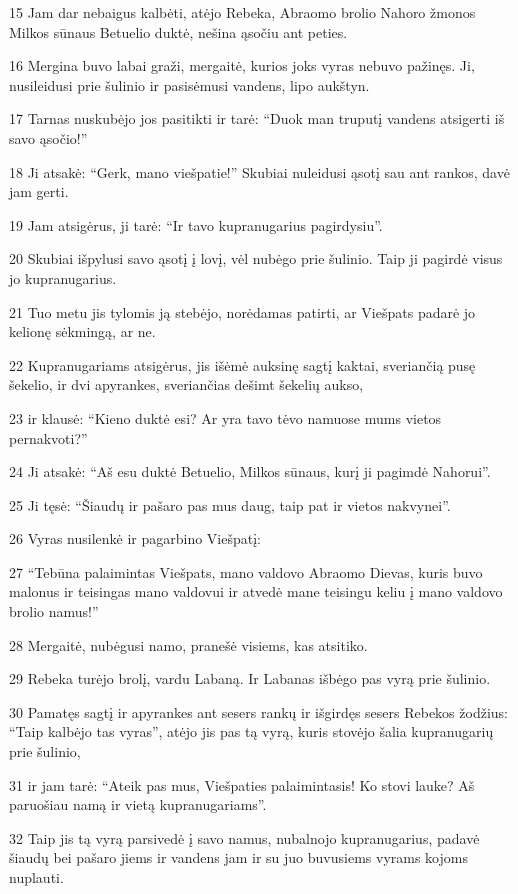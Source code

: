 \par 15 Jam dar nebaigus kalbėti, atėjo Rebeka, Abraomo brolio Nahoro žmonos Milkos sūnaus Betuelio duktė, nešina ąsočiu ant peties. 
\par 16 Mergina buvo labai graži, mergaitė, kurios joks vyras nebuvo pažinęs. Ji, nusileidusi prie šulinio ir pasisėmusi vandens, lipo aukštyn. 
\par 17 Tarnas nuskubėjo jos pasitikti ir tarė: “Duok man truputį vandens atsigerti iš savo ąsočio!” 
\par 18 Ji atsakė: “Gerk, mano viešpatie!” Skubiai nuleidusi ąsotį sau ant rankos, davė jam gerti. 
\par 19 Jam atsigėrus, ji tarė: “Ir tavo kupranugarius pagirdysiu”. 
\par 20 Skubiai išpylusi savo ąsotį į lovį, vėl nubėgo prie šulinio. Taip ji pagirdė visus jo kupranugarius. 
\par 21 Tuo metu jis tylomis ją stebėjo, norėdamas patirti, ar Viešpats padarė jo kelionę sėkmingą, ar ne. 
\par 22 Kupranugariams atsigėrus, jis išėmė auksinę sagtį kaktai, sveriančią pusę šekelio, ir dvi apyrankes, sveriančias dešimt šekelių aukso, 
\par 23 ir klausė: “Kieno duktė esi? Ar yra tavo tėvo namuose mums vietos pernakvoti?” 
\par 24 Ji atsakė: “Aš esu duktė Betuelio, Milkos sūnaus, kurį ji pagimdė Nahorui”. 
\par 25 Ji tęsė: “Šiaudų ir pašaro pas mus daug, taip pat ir vietos nakvynei”. 
\par 26 Vyras nusilenkė ir pagarbino Viešpatį: 
\par 27 “Tebūna palaimintas Viešpats, mano valdovo Abraomo Dievas, kuris buvo malonus ir teisingas mano valdovui ir atvedė mane teisingu keliu į mano valdovo brolio namus!” 
\par 28 Mergaitė, nubėgusi namo, pranešė visiems, kas atsitiko. 
\par 29 Rebeka turėjo brolį, vardu Labaną. Ir Labanas išbėgo pas vyrą prie šulinio. 
\par 30 Pamatęs sagtį ir apyrankes ant sesers rankų ir išgirdęs sesers Rebekos žodžius: “Taip kalbėjo tas vyras”, atėjo jis pas tą vyrą, kuris stovėjo šalia kupranugarių prie šulinio, 
\par 31 ir jam tarė: “Ateik pas mus, Viešpaties palaimintasis! Ko stovi lauke? Aš paruošiau namą ir vietą kupranugariams”. 
\par 32 Taip jis tą vyrą parsivedė į savo namus, nubalnojo kupranugarius, padavė šiaudų bei pašaro jiems ir vandens jam ir su juo buvusiems vyrams kojoms nuplauti. 
